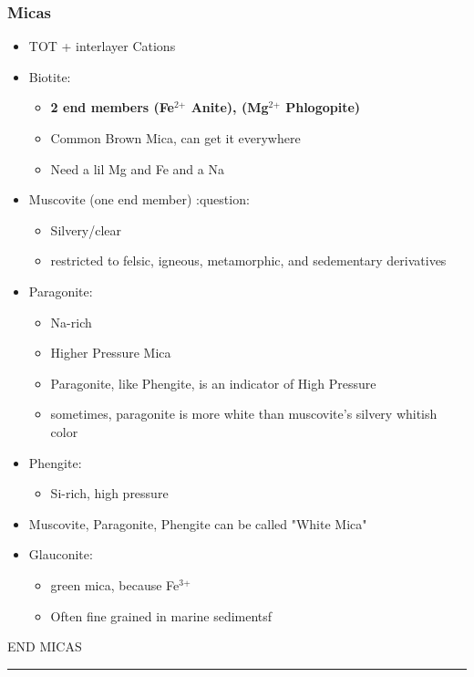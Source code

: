 \documentclass[11pt]{article}
\begin{document}
\subsubsection{Micas}
\label{sec-4-1-1}
\begin{itemize}
\item TOT + interlayer Cations
\item Biotite:
\begin{itemize}
\item \textbf{2 end members (Fe$^{\text{2+}}$ Anite), (Mg$^{\text{2+}}$ Phlogopite)}
\item Common Brown Mica, can get it everywhere
\item Need a lil Mg and Fe and a Na
\end{itemize}
\item Muscovite (one end member) :question:
\begin{itemize}
\item Silvery/clear
\item restricted to felsic, igneous, metamorphic, and sedementary derivatives
\end{itemize}
\item Paragonite:
\begin{itemize}
\item Na-rich
\item Higher Pressure Mica
\item Paragonite, like Phengite, is an indicator of High Pressure
\item sometimes, paragonite is more white than muscovite's silvery whitish color
\end{itemize}
\item Phengite:
\begin{itemize}
\item Si-rich, high pressure
\end{itemize}
\item Muscovite, Paragonite, Phengite can be called "White Mica"
\item Glauconite:
\begin{itemize}
\item green mica, because Fe$^{\text{3+}}$
\item Often fine grained in marine sedimentsf
\end{itemize}
\end{itemize}
END MICAS

\rule{\linewidth}{0.5pt}
\end{document}
